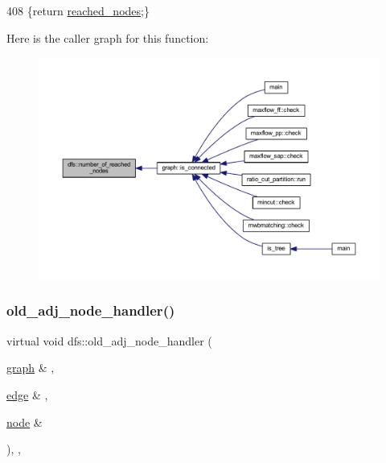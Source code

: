 \begin{DoxyCode}
408     \{\textcolor{keywordflow}{return} \mbox{\hyperlink{classdfs_acb11186a1a2a2a1f38cdc0674340ba37}{reached\_nodes}};\}
\end{DoxyCode}
Here is the caller graph for this function\+:
\nopagebreak
\begin{figure}[H]
\begin{center}
\leavevmode
\includegraphics[width=350pt]{classdfs_ae8849a552721ad4af5d9a81c6da35822_icgraph}
\end{center}
\end{figure}
\mbox{\label{classdfs_a33d1d2caa38dd038e03fa4041f5b9521}} 
\subsubsection{\texorpdfstring{old\+\_\+adj\+\_\+node\+\_\+handler()}{old\_adj\_node\_handler()}}
{\footnotesize\ttfamily virtual void dfs\+::old\+\_\+adj\+\_\+node\+\_\+handler (\begin{DoxyParamCaption}\item[{\mbox{\hyperlink{classgraph}{graph}} \&}]{,  }\item[{\mbox{\hyperlink{classedge}{edge}} \&}]{,  }\item[{\mbox{\hyperlink{classnode}{node}} \&}]{ }\end{DoxyParamCaption})\hspace{0.3cm}{\ttfamily [inline]}, {\ttfamily [virtual]}, {\ttfamily [inherited]}}



